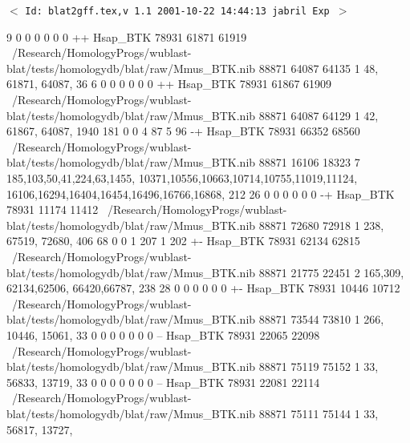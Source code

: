 \documentclass[11pt]{article}
\def\nwendcode{\endtrivlist \endgroup} %
\let\nwdocspar=\par                    %
\begin{document}
%

\newpage %
\setcounter{page}{1}
\pagestyle{fancy}
\renewcommand{\sectionmark}[1]{\markboth{}{\thesection.\ #1}}
\renewcommand{\subsectionmark}[1]{\markboth{}{\thesubsection.\ \textsl{#1}}}

\tableofcontents
\listoftables
\listoffigures

\vfill
\begin{center}
{\small$<$ \verb$Id: blat2gff.tex,v 1.1 2001-10-22 14:44:13 jabril Exp $$>$ }
\end{center}


\newpage %
\setcounter{page}{1}




\nwenddocs{}  9   0   0   0   0   0   0   ++  Hsap_BTK    78931   61871   61919   ~/Research/HomologyProgs/wublast-blat/tests/homologydb/blat/raw/Mmus_BTK.nib    88871   64087   64135   1   48, 61871,  64087,
36  6   0   0   0   0   0   0   ++  Hsap_BTK    78931   61867   61909   ~/Research/HomologyProgs/wublast-blat/tests/homologydb/blat/raw/Mmus_BTK.nib    88871   64087   64129   1   42, 61867,  64087,
1940    181 0   0   4   87  5   96  -+  Hsap_BTK    78931   66352   68560   ~/Research/HomologyProgs/wublast-blat/tests/homologydb/blat/raw/Mmus_BTK.nib    88871   16106   18323   7   185,103,50,41,224,63,1455,  10371,10556,10663,10714,10755,11019,11124,  16106,16294,16404,16454,16496,16766,16868,
212 26  0   0   0   0   0   0   -+  Hsap_BTK    78931   11174   11412   ~/Research/HomologyProgs/wublast-blat/tests/homologydb/blat/raw/Mmus_BTK.nib    88871   72680   72918   1   238,    67519,  72680,
406 68  0   0   1   207 1   202 +-  Hsap_BTK    78931   62134   62815   ~/Research/HomologyProgs/wublast-blat/tests/homologydb/blat/raw/Mmus_BTK.nib    88871   21775   22451   2   165,309,    62134,62506,    66420,66787,
238 28  0   0   0   0   0   0   +-  Hsap_BTK    78931   10446   10712   ~/Research/HomologyProgs/wublast-blat/tests/homologydb/blat/raw/Mmus_BTK.nib    88871   73544   73810   1   266,    10446,  15061,
33  0   0   0   0   0   0   0   --  Hsap_BTK    78931   22065   22098   ~/Research/HomologyProgs/wublast-blat/tests/homologydb/blat/raw/Mmus_BTK.nib    88871   75119   75152   1   33, 56833,  13719,
33  0   0   0   0   0   0   0   --  Hsap_BTK    78931   22081   22114   ~/Research/HomologyProgs/wublast-blat/tests/homologydb/blat/raw/Mmus_BTK.nib    88871   75111   75144   1   33, 56817,  13727,
\nwendcode{}\nwdocspar
\end{document}
